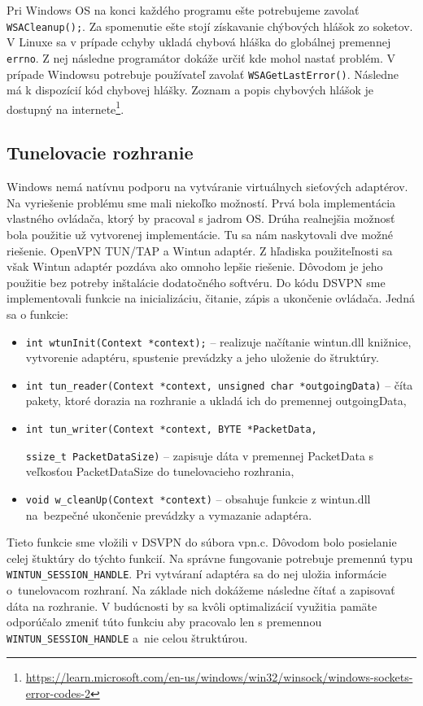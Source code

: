 Pri Windows OS na konci každého programu ešte potrebujeme zavolať \\\lstinline|WSACleanup();|. Za spomenutie ešte stojí získavanie chýbových hlášok zo soketov. V Linuxe sa v prípade cchyby ukladá chybová hláška do globálnej premennej  \lstinline|errno|. Z nej následne programátor dokáže určiť kde mohol nastať problém. V prípade Windowsu potrebuje používateľ zavolať \lstinline|WSAGetLastError()|. Následne má k dispozícií kód chybovej hlášky. Zoznam a popis chybových hlášok je dostupný na internete\footnote{\url{https://learn.microsoft.com/en-us/windows/win32/winsock/windows-sockets-error-codes-2}}.  
\subsection{Tunelovacie rozhranie}
Windows nemá natívnu podporu na vytváranie virtuálnych sieťových adaptérov. Na vyriešenie problému sme mali niekoľko možností. Prvá bola implementácia vlastného ovládača, ktorý by pracoval s jadrom OS. Drúha realnejšia možnosť bola použitie už vytvorenej implementácie. Tu sa nám naskytovali dve možné riešenie. OpenVPN TUN/TAP a Wintun adaptér. Z hľadiska použiteľnosti sa však Wintun adaptér pozdáva ako omnoho lepšie riešenie. Dôvodom je jeho použitie bez potreby inštalácie dodatočného softvéru. 
Do kódu DSVPN sme implementovali funkcie na inicializáciu, čitanie, zápis a ukončenie ovládača. Jedná sa o funkcie: 
\begin{itemize}
	\item\lstinline|int wtunInit(Context *context);| -- realizuje načítanie wintun.dll knižnice, vytvorenie adaptéru, spustenie prevádzky a jeho uloženie do štruktúry.
	\item\lstinline|int tun_reader(Context *context, unsigned char *outgoingData)| -- číta pakety, ktoré dorazia na rozhranie a ukladá ich do premennej outgoingData,
	\item\lstinline|int tun_writer(Context *context, BYTE *PacketData,| 
	
		\lstinline|ssize_t PacketDataSize)| -- zapisuje dáta v premennej PacketData s veľkosťou PacketDataSize do tunelovacieho rozhrania,
	\item\lstinline|void w_cleanUp(Context *context)| -- obsahuje funkcie z wintun.dll na~bezpečné ukončenie prevádzky a vymazanie adaptéra.
\end{itemize} 

Tieto funkcie sme vložili v DSVPN do súbora vpn.c. Dôvodom bolo posielanie celej štuktúry do týchto funkcií. Na správne fungovanie potrebuje premennú typu \lstinline|WINTUN_SESSION_HANDLE|. Pri vytváraní adaptéra sa do nej uložia informácie o~tunelovacom rozhraní. Na základe nich dokážeme následne čítať a zapisovať dáta na rozhranie. V budúcnosti by sa kvôli optimalizácií využitia pamäte odporúčalo zmeniť túto funkciu aby pracovalo len s premennou \lstinline|WINTUN_SESSION_HANDLE| a~nie celou štruktúrou.

